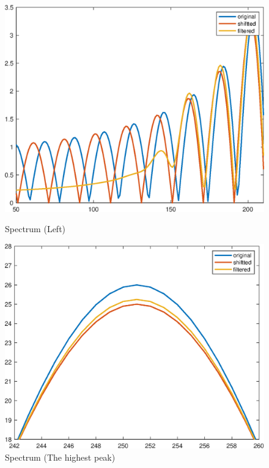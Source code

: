 \documentclass{article}
\begin{document}
\begin{figure}[H]
\begin{minipage}[b]{0.46\linewidth}
		\includegraphics[width=\linewidth]{spectrum_prime.eps}
		\caption{Spectrum (Left)}
		\label{left}
	\end{minipage}
	\begin{minipage}[b]{0.46\linewidth}
		\includegraphics[width=\linewidth]{spectrum_prime2.eps}
		\caption{Spectrum (The highest peak)}
		\label{head}
	\end{minipage}
\end{figure}
\end{document}
